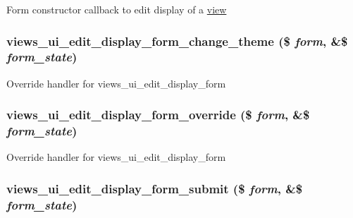 Form constructor callback to edit display of a \hyperlink{classview}{view} \hypertarget{admin_8inc_645b4cf556061727a6d09a0d64770b30}{
\subsubsection[{views\_\-ui\_\-edit\_\-display\_\-form\_\-change\_\-theme}]{\setlength{\rightskip}{0pt plus 5cm}views\_\-ui\_\-edit\_\-display\_\-form\_\-change\_\-theme (\$ {\em form}, \/  \&\$ {\em form\_\-state})}}
\label{admin_8inc_645b4cf556061727a6d09a0d64770b30}


Override handler for views\_\-ui\_\-edit\_\-display\_\-form \hypertarget{admin_8inc_5d8a67bc769fcccdad46636e063079d2}{
\subsubsection[{views\_\-ui\_\-edit\_\-display\_\-form\_\-override}]{\setlength{\rightskip}{0pt plus 5cm}views\_\-ui\_\-edit\_\-display\_\-form\_\-override (\$ {\em form}, \/  \&\$ {\em form\_\-state})}}
\label{admin_8inc_5d8a67bc769fcccdad46636e063079d2}


Override handler for views\_\-ui\_\-edit\_\-display\_\-form \hypertarget{admin_8inc_2272bcea1334751c9c2e8d6b04ae64af}{
\subsubsection[{views\_\-ui\_\-edit\_\-display\_\-form\_\-submit}]{\setlength{\rightskip}{0pt plus 5cm}views\_\-ui\_\-edit\_\-display\_\-form\_\-submit (\$ {\em form}, \/  \&\$ {\em form\_\-state})}}
\label{admin_8inc_2272bcea1334751c9c2e8d6b04ae64af}


